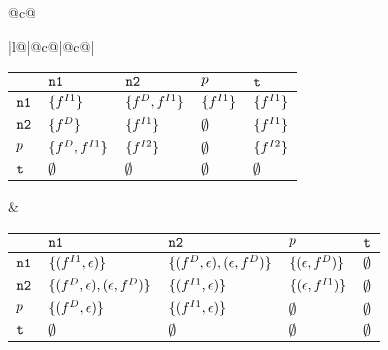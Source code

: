 \begin{figure}
{\begin{tabular}{@{}c@{}}
{\begin{tabular}[b]{|l@{}|@{}c@{}|@{}c@{}|}
\begin{tabular}{|p{3mm}|p{12mm}p{12mm}p{12mm}p{12mm}|}
            & $\mbox{\tt n1}$  								& $\mbox{\tt n2}$ 				& $p$ 			& $\mbox{\tt t}$ \\ \hline
  $\mbox{\tt n1}$ 	& $\{{f}_{}^{I1}\}$						& $\{{f}_{}^{D}, {f}_{}^{I1}\}$	& $\{{f}_{}^{I1}\}$	& $\{{f}_{}^{I1}\}$ \\ \hline
  $\mbox{\tt n2}$ 	& $\{{f}_{}^{D}\}$						& $\{{f}_{}^{I1}\}$			& $\emptyset$	& $\{{f}_{}^{I1}\}$ \\ \hline
  $p$ 		& $\{{f}_{}^{D}, {f}_{}^{I1}\}$	& $\{{f}_{}^{I2}\}$		& $\emptyset$	& $\{{f}_{}^{I2}\}$ \\ \hline
  $\mbox{\tt t}$ 	& $\emptyset$							& $\emptyset$			& $\emptyset$	& $\emptyset$ \\ \hline
\end{tabular}
 &
\begin{tabular}{|p{3mm}|p{28mm}p{28mm}p{28mm}p{28mm}|} \hline 
			& $\mbox{\tt n1}$  											& $\mbox{\tt n2}$ 														& $p$ 			& $\mbox{\tt t}$ \\ \hline
	$\mbox{\tt n1}$ 	& $\{({f}_{}^{I1}, \epsilon)\}$					& $\{({f}_{}^{D}, \epsilon), (\epsilon, {f}_{}^{D})\}$		& $\{(\epsilon, {f}_{}^{D})\}$	& $\emptyset$ \\ \hline
  $\mbox{\tt n2}$ 	& $\{({f}_{}^{D}, \epsilon), (\epsilon, {f}_{}^{D})\}$	& $\{({f}_{}^{I1}, \epsilon)\}$						& $\{(\epsilon, {f}_{}^{I1})\}$	& $\emptyset$ \\ \hline
  $p$ 		& $\{({f}_{}^{D}, \epsilon)\}$	& $\{({f}_{}^{I1}, \epsilon)\}$	& $\emptyset$	& $\emptyset$ \\ \hline
  $\mbox{\tt t}$ 	& $\emptyset$						& $\emptyset$						& $\emptyset$	& $\emptyset$ \\ \hline
\end{tabular} \\ \hline


\end{tabular}}
\end{tabular}}
\end{figure}
